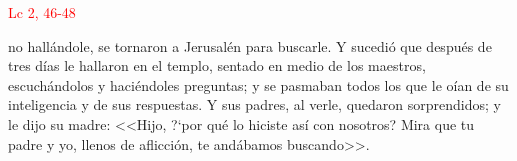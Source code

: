\hfill\textcolor{red}{Lc 2, 46-48}

 no hallándole, se tornaron a Jerusalén para buscarle. Y sucedió que después de tres días le hallaron en el templo,
sentado en medio de los maestros, escuchándolos y haciéndoles preguntas; y se pasmaban todos los que le oían de su inteligencia y de sus respuestas.
Y sus padres, al verle, quedaron sorprendidos; y le dijo su madre: <<Hijo, {?`}por qué lo hiciste así con nosotros? Mira que tu padre y yo, llenos de aflicción, 
te andábamos buscando>>.